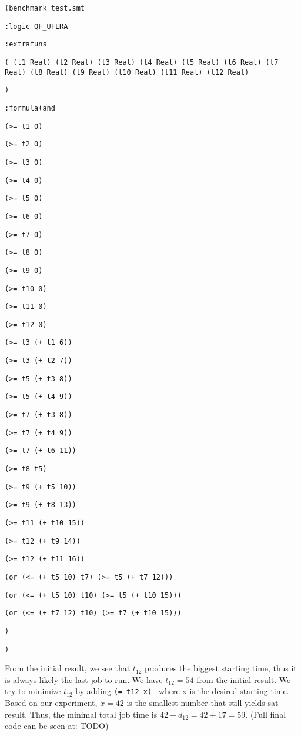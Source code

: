 \documentclass[12pt]{article}
\begin{document}
{\footnotesize

{\tt (benchmark test.smt }

{\tt :logic QF\_UFLRA }

{\tt :extrafuns }

{\tt ( (t1 Real) (t2 Real) (t3 Real) (t4 Real) (t5 Real) (t6 Real) (t7 Real) (t8 Real) (t9 Real) (t10 Real) (t11 Real) (t12 Real) }

{\tt ) }

{\tt :formula(and  }

{\tt (>= t1 0) }

{\tt (>= t2 0) }

{\tt (>= t3 0) }

{\tt (>= t4 0) }

{\tt (>= t5 0) }

{\tt (>= t6 0) }

{\tt (>= t7 0) }

{\tt (>= t8 0) }

{\tt (>= t9 0) }

{\tt (>= t10 0) }

{\tt (>= t11 0) }

{\tt (>= t12 0) }

{\tt (>= t3 (+ t1 6)) }

{\tt (>= t3 (+ t2 7)) }

{\tt (>= t5 (+ t3 8)) }

{\tt (>= t5 (+ t4 9)) }

{\tt (>= t7 (+ t3 8)) }

{\tt (>= t7 (+ t4 9)) }

{\tt (>= t7 (+ t6 11)) }

{\tt (>= t8 t5) }

{\tt (>= t9 (+ t5 10)) }

{\tt (>= t9 (+ t8 13)) }

{\tt (>= t11 (+ t10 15)) }

{\tt (>= t12 (+ t9 14)) }

{\tt (>= t12 (+ t11 16)) }

{\tt (or (<= (+ t5 10) t7) (>= t5 (+ t7 12))) }

{\tt (or (<= (+ t5 10) t10) (>= t5 (+ t10 15))) }

{\tt (or (<= (+ t7 12) t10) (>= t7 (+ t10 15))) }

{\tt  }

{\tt   }

{\tt  }

{\tt ) }

{\tt  }

{\tt ) }
	
}
From the initial result, we see that $t_{12}$ produces the biggest starting time, thus it is always likely the last job to run. We have $t_{12}=54$ from the initial result. We try to minimize $t_{12}$ by adding {\tt (= t12 x) } where x is the desired starting time. Based on our experiment, $x=42$ is the smallest number that still yields sat result. Thus, the minimal total job time is $42+d_{12}=42+17=59$. (Full final code can be seen at: TODO)
\end{document}
